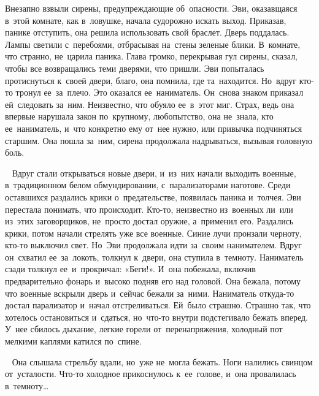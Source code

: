 Внезапно взвыли сирены, предупреждающие об~опасности.
Эви, оказавщаяся в~этой комнате, как в~ловушке, начала судорожно искать выход.
Приказав, панике отступить, она решила использовать свой браслет.
Дверь поддалась.
Лампы светили с~перебоями, отбрасывая на~стены зеленые блики.
В~комнате, что странно, не~царила паника.
Глава громко, перекрывая гул сирены, сказал, чтобы все возвращались теми дверями, что пришли.
Эви попыталась протиснуться к~своей двери, благо, она помнила, где та~находится.
Но~вдруг кто-то тронул ее~за~плечо.
Это оказался ее~наниматель.
Он~снова знаком приказал ей~следовать за~ним.
Неизвестно, что обуяло ее~в~этот миг.
Страх, ведь она впервые нарушала закон по~крупному, любопытство, она не~знала, кто ее~наниматель, и~что конкретно ему от~нее нужно, или привычка подчиняться старшим.
Она пошла за~ним, сирена продолжала надрываться, вызывая головную боль.

~
Вдруг стали открываться новые двери, и~из~них начали выходить военные, в~традиционном белом обмундировании, с~парализаторами наготове.
Среди оставшихся раздались крики о~предательстве, появилась паника и~толчея.
Эви перестала понимать, что происходит.
Кто-то, неизвестно из~военных ли~или из~этих заговорщиков, не~просто достал оружие, а~применил его.
Раздались крики, потом начали стрелять уже все военные.
Синие лучи пронзали черноту, кто-то выключил свет.
Но~Эви продолжала идти за~своим нанимателем.
Вдруг он~схватил ее~за~локоть, толкнул к~двери, она ступила в~темноту.
Наниматель сзади толкнул ее~и~прокричал: «Беги!».
И~она побежала, включив предварительно фонарь и~высоко подняв его над головой.
Она бежала, потому что военные вскрыли дверь и~сейчас бежали за~ними.
Наниматель откуда-то достал парализатор и~начал отстреливаться.
Ей~было страшно.
Страшно так, что хотелось остановиться и~сдаться, но~что-то внутри подстегивало бежать вперед.
У~нее сбилось дыхание, легкие горели от~перенапряжения, холодный пот мелкими каплями катился по~спине.

~
Она слышала стрельбу вдали, но~уже не~могла бежать.
Ноги налились свинцом от~усталости.
Что-то холодное прикоснулось к~ее~голове, и~она провалилась в~темноту…
 

